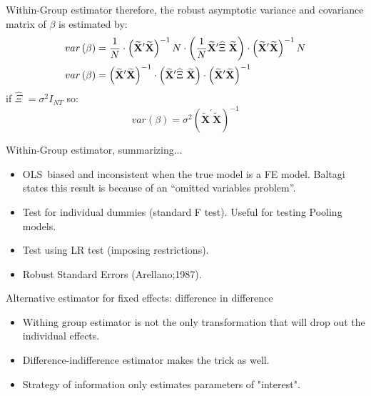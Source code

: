 \begin{frame}{Within-Group estimator}
	therefore, the robust asymptotic variance and covariance matrix of $\beta$ is estimated by:
		\begin{align}
			var\left( \beta \right) & = \frac{1}{N}\cdot \left( \widetilde{\mathbf{X}}%
			^{\prime }\widetilde{\mathbf{X}}\right) ^{-1}N\cdot \left( \frac{1}{N}%
			\widetilde{\mathbf{X}}^{\prime }\widehat{\Xi }\text{ }\widetilde{\mathbf{X}}%
			\right) \cdot \left( \widetilde{\mathbf{X}}^{\prime }\widetilde{\mathbf{X}}%
			\right) ^{-1}N  \notag \\
			var\left( \beta \right) & = \left( \widetilde{\mathbf{X}}^{\prime }\widetilde{%
				\mathbf{X}}\right) ^{-1}\cdot \left( \widetilde{\mathbf{X}}^{\prime }%
			\widehat{\Xi }\text{ }\widetilde{\mathbf{X}}\right) \cdot \left( \widetilde{%
				\mathbf{X}}^{\prime }\widetilde{\mathbf{X}}\right) ^{-1}
		\end{align}
	if $\widehat{\Xi }$ $=\sigma ^{2}I_{NT}$ so:
		$$var\left( \beta \right) =\sigma ^{2}\left( \widetilde{\mathbf{X}}^{\prime }\widetilde{\mathbf{X}}\right) ^{-1}$$
\end{frame}
\begin{frame}{Within-Group estimator, summarizing...}
	\begin{itemize}
		\item OLS\ biased and inconsistent when the true model is a FE model. Baltagi states this result is because of an ``omitted variables problem''.
		\item Test for individual dummies (standard F test). Useful for testing Pooling models.
		\item Test using LR test (imposing restrictions).
		\item Robust Standard Errors (Arellano;1987).
	\end{itemize}
\end{frame}
\begin{frame}{Alternative estimator for fixed effects: difference in difference}
	\begin{itemize}
		\item Withing group estimator is not the only transformation that will drop out the individual effects.
		\item Difference-indifference estimator makes the trick as well.
		\item Strategy of information only estimates parameters of "interest".
	\end{itemize}
\end{frame}
